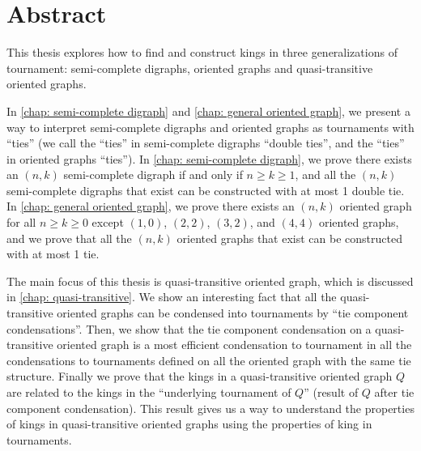 \chapter{Abstract}

This thesis explores how to find and construct kings
in three generalizations of tournament:
semi-complete digraphs, oriented graphs and
quasi-transitive oriented graphs.

In \cref{chap: semi-complete digraph} and \cref{chap: general oriented graph},
we present a way to interpret semi-complete digraphs
and oriented graphs as tournaments with ``ties''
(we call the ``ties'' in semi-complete digraphs ``double ties'',
and the ``ties'' in oriented graphs ``ties'').
In \cref{chap: semi-complete digraph},
we prove there exists an \((n, k)\) semi-complete digraph
if and only if \(n \geq k \geq 1\),
and all the \((n, k)\) semi-complete digraphs that exist
can be constructed with at most 1 double tie.
In \cref{chap: general oriented graph},
we prove there exists an \((n, k)\) oriented graph
for all \(n \geq k \geq 0\) except
\((1,0)\), \((2,2)\), \((3,2)\), and \((4,4)\) oriented graphs,
and we prove that
all the \((n, k)\) oriented graphs that exist
can be constructed with at most 1 tie.

The main focus of this thesis is quasi-transitive oriented graph,
which is discussed in \cref{chap: quasi-transitive}.
We show an interesting fact that
all the quasi-transitive oriented graphs
can be condensed into tournaments by
``tie component condensations''.
Then, we show that the tie component condensation
on a quasi-transitive oriented graph
is a most efficient condensation to tournament
in all the condensations to tournaments
defined on all the oriented graph with the same tie structure.
Finally we prove that the kings in
a quasi-transitive oriented graph \(Q\)
are related to
the kings in the ``underlying tournament of \(Q\)''
(result of \(Q\) after tie component condensation).
This result gives us a way to understand the
properties of kings in quasi-transitive oriented graphs
using the properties of king in tournaments.
